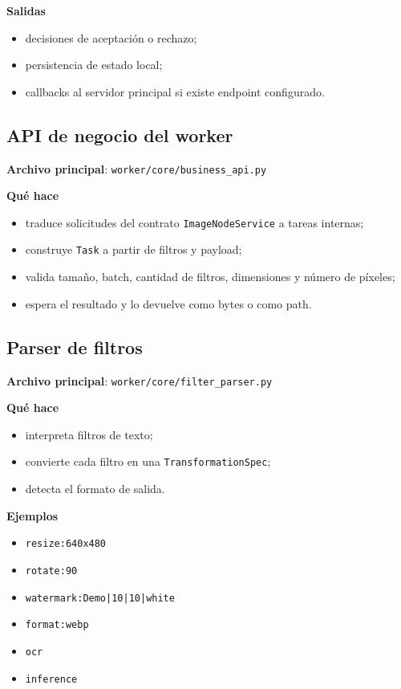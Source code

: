 \documentclass[11pt]{article}
\begin{document}
\textbf{Salidas}
\begin{itemize}
\item decisiones de aceptación o rechazo;
\item persistencia de estado local;
\item callbacks al servidor principal si existe endpoint configurado.
\end{itemize}

\subsection{API de negocio del worker}
\textbf{Archivo principal}: \texttt{worker/core/business\_api.py}

\textbf{Qué hace}
\begin{itemize}
\item traduce solicitudes del contrato \texttt{ImageNodeService} a tareas internas;
\item construye \texttt{Task} a partir de filtros y payload;
\item valida tamaño, batch, cantidad de filtros, dimensiones y número de píxeles;
\item espera el resultado y lo devuelve como bytes o como path.
\end{itemize}

\subsection{Parser de filtros}
\textbf{Archivo principal}: \texttt{worker/core/filter\_parser.py}

\textbf{Qué hace}
\begin{itemize}
\item interpreta filtros de texto;
\item convierte cada filtro en una \texttt{TransformationSpec};
\item detecta el formato de salida.
\end{itemize}

\textbf{Ejemplos}
\begin{itemize}
\item \texttt{resize:640x480}
\item \texttt{rotate:90}
\item \texttt{watermark:Demo|10|10|white}
\item \texttt{format:webp}
\item \texttt{ocr}
\item \texttt{inference}
\end{itemize}
\end{document}

